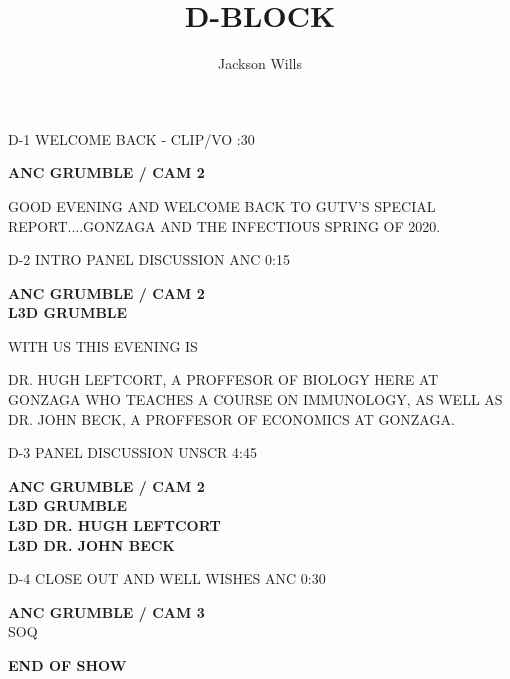 \documentclass{article}
\title{D-BLOCK}
\author{Jackson Wills}
\newenvironment{changemargin}[2]{%
\begin{list}{}{%
\setlength{\topsep}{0pt}%
\setlength{\leftmargin}{#1}%
\setlength{\rightmargin}{#2}%
\setlength{\listparindent}{\parindent}%
\setlength{\itemindent}{\parindent}%
\setlength{\parsep}{\parskip}%
}%
\item[]}{\end{list}}
\begin{document}
\maketitle
\begin{flushleft}
\begin{changemargin}{-3cm}{-5cm}
\color{red}
D-1     WELCOME BACK - CLIP/VO  :30
\vspace{5mm}

\color{black}
\textbf{
ANC GRUMBLE / CAM 2} \\

\end{changemargin}

\begin{changemargin}{4cm}{1cm}
GOOD EVENING AND WELCOME BACK TO GUTV'S SPECIAL REPORT....GONZAGA AND THE INFECTIOUS SPRING OF 2020.
\end{changemargin}
\vspace{10 mm}
\begin{changemargin}{-3cm}{-5cm}
\color{red}
D-2     INTRO PANEL DISCUSSION  ANC  0:15

\color{black}

\textbf{
ANC GRUMBLE / CAM 2 \\
L3D GRUMBLE \\}

\end{changemargin}

WITH US THIS EVENING IS

DR. HUGH LEFTCORT, A PROFFESOR OF BIOLOGY HERE AT GONZAGA WHO TEACHES A COURSE ON IMMUNOLOGY, AS WELL AS DR. JOHN BECK, A PROFFESOR OF ECONOMICS AT GONZAGA.
\vspace{10 mm}
\begin{changemargin}{-3cm}{-5cm}
\color{red}
D-3     PANEL DISCUSSION  UNSCR  4:45

\color{black}

\textbf{
ANC GRUMBLE / CAM 2 \\
L3D GRUMBLE \\
L3D DR. HUGH LEFTCORT \\
L3D DR. JOHN BECK}

\end{changemargin}


\vspace{10 mm}
\begin{changemargin}{-3cm}{-5cm}
\color{red}
D-4     CLOSE OUT AND WELL WISHES  ANC  0:30

\color{black}

\textbf{
ANC GRUMBLE / CAM 3} \\
\color{red}
SOQ
\end{changemargin}



\begin{changemargin}{4cm}{1cm}
\color{blue}
\textbf{END OF SHOW}
\end{changemargin}











\end{flushleft}
\end{document}
